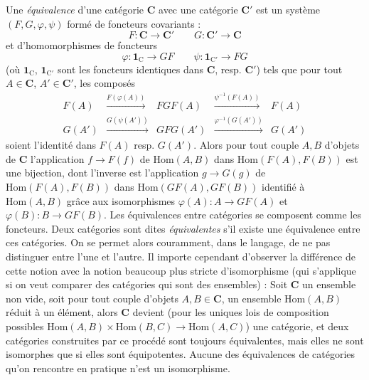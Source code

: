 Une \textit{équivalence} d'une catégorie $\mathbf{C}$ avec une catégorie $\mathbf{C}'$ est un
système $(F,G,\varphi,\psi)$ formé de foncteurs covariants :
\[
  F:\mathbf{C}\to\mathbf{C}' \qquad G:\mathbf{C}'\to\mathbf{C}
\]
et d'homomorphismes de foncteurs
\[
  \varphi:\mathbf{1}_{\mathrm{C}}\to GF \qquad
  \psi:\mathbf{1}_{\mathrm{C}'}\to FG
\]
(où $\mathbf{1}_{\mathrm{C}}$, $\mathbf{1}_{\mathrm{C}'}$ sont les foncteurs identiques dans $\mathbf{C}$, resp. $\mathbf{C}'$) tels
que pour tout $A\in \mathbf{C}$, $A'\in \mathbf{C}'$, les composés
\[
\begin{array}{ccccc}
F(A) & \stackrel{F(\varphi(A))}{\longrightarrow} & FGF(A) &
\stackrel{\psi^{-1}(F(A))}{\longrightarrow} & F(A) \\
G(A') & \stackrel{G(\psi(A'))}{\longrightarrow} & GFG(A') &
\stackrel{\varphi^{-1}(G(A'))}{\longrightarrow} & G(A')
\end{array}
\]
soient l'identité dans $F(A)$ resp. $G(A')$. Alors pour tout couple $A,B$
d'objets de $\mathbf{C}$ l'application $f\to F(f)$ de
$\mathrm{Hom}(A,B)$ dans $\mathrm{Hom}(F(A),F(B))$ est une bijection, dont
l'inverse est l'application $g\to G(g)$ de
$\mathrm{Hom}(F(A),F(B))$ dans $\mathrm{Hom}(GF(A),GF(B))$ identifié à
$\mathrm{Hom}(A,B)$ grâce aux isomorphismes
$\varphi(A):A\to GF(A)$ et
$\varphi(B):B\to GF(B)$. Les équivalences entre catégories se
composent comme les foncteurs. Deux catégories sont dites
\textit{équivalentes} s'il existe une équivalence entre ces catégories. On se
permet alors couramment, dans le langage, de ne pas distinguer entre l'une et
l'autre. Il importe cependant d'observer la différence de cette notion avec la
notion beaucoup plus stricte d'isomorphisme (qui s'applique si on veut comparer
des catégories qui sont des ensembles) : Soit $\mathbf{C}$ un ensemble non vide, soit
pour tout couple d'objets $A,B\in \mathbf{C}$, un ensemble $\mathrm{Hom}(A,B)$ réduit à
un élément, alors $\mathbf{C}$ devient (pour les uniques lois de composition possibles
$\mathrm{Hom}(A,B)\times\mathrm{Hom}(B,C)\to\mathrm{Hom}(A,C)$)
une catégorie, et deux catégories construites par ce procédé sont toujours
équivalentes, mais elles ne sont isomorphes que si elles sont équipotentes.
Aucune des équivalences de catégories qu'on rencontre en pratique n'est un
isomorphisme.

